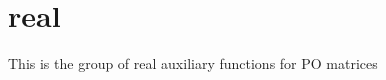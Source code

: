 \hypertarget{group__realPOauxiliary}{}\section{real}
\label{group__realPOauxiliary}
This is the group of real auxiliary functions for P\+O matrices 